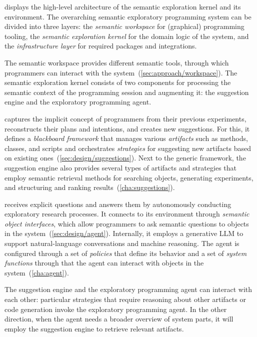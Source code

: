  displays the high-level architecture of the semantic exploration kernel and its environment.
The overarching semantic exploratory programming system can be divided into three layers: the \emph{semantic workspace} for (graphical) programming tooling, the \emph{semantic exploration kernel} for the domain logic of the system, and the \emph{infrastructure layer} for required packages and integrations.

The semantic workspace provides different semantic tools, through which programmers can interact with the system~(\cref{sec:approach/workspace}).
The semantic exploration kernel consists of two components for processing the semantic context of the programming session and augmenting it: the suggestion engine and the exploratory programming agent.

\begin{description}[noextralabelsep]
	\item[The suggestion engine] captures the implicit concept of programmers from their previous experiments, reconstructs their plans and intentions, and creates new suggestions.
	For this, it defines a \emph{blackboard framework} that manages various \emph{artifacts} such as methods, classes, and scripts and orchestrates \emph{strategies} for suggesting new artifacts based on existing ones~(\cref{sec:design/suggestions}).
	Next to the generic framework, the suggestion engine also provides several types of artifacts and strategies that employ semantic retrieval methods for searching objects, generating experiments, and structuring and ranking results~(\cref{cha:suggestions}).
	\item[The exploratory programming agent] receives explicit questions and answers them by autonomously conducting exploratory research processes.
	It connects to its environment through \emph{semantic object interfaces}, which allow programmers to ask semantic questions to objects in the system~(\cref{sec:design/agent}).
	Internally, it employs a generative LLM to support natural-language conversations and machine reasoning.
	The agent is configured through a set of \emph{policies} that define its behavior and a set of \emph{system functions} through that the agent can interact with objects in the system~(\cref{cha:agent}).
\end{description}

The suggestion engine and the exploratory programming agent can interact with each other:
particular strategies that require reasoning about other artifacts or code generation invoke the exploratory programming agent.
In the other direction, when the agent needs a broader overview of system parts, it will employ the suggestion engine to retrieve relevant artifacts.

